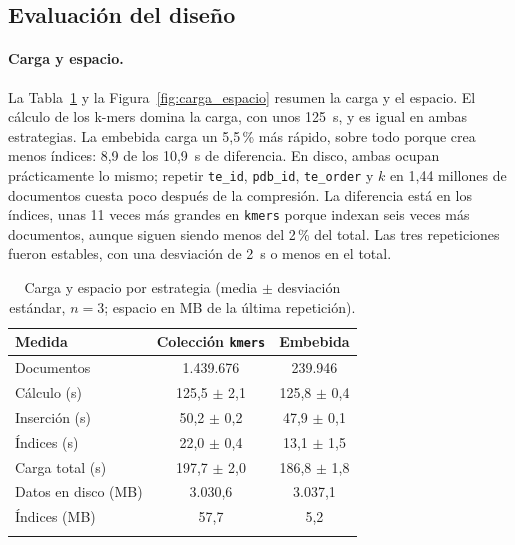 \documentclass[unnumsec,namedate,webpdf,contemporary,large]{oup-authoring-template}
\begin{document}
\subsection{Evaluaci\'on del dise\~no}

\paragraph{Carga y espacio.}
La Tabla~\ref{tab:carga} y la Figura~\ref{fig:carga_espacio} resumen la carga y el espacio. El c\'alculo de los k-mers domina la carga, con unos 125~s, y es igual en ambas estrategias. La embebida carga un 5,5\,\% m\'as r\'apido, sobre todo porque crea menos \'indices: 8,9 de los 10,9~s de diferencia. En disco, ambas ocupan pr\'acticamente lo mismo; repetir \texttt{te\_id}, \texttt{pdb\_id}, \texttt{te\_order} y $k$ en 1,44 millones de documentos cuesta poco despu\'es de la compresi\'on. La diferencia est\'a en los \'indices, unas 11 veces m\'as grandes en \texttt{kmers} porque indexan seis veces m\'as documentos, aunque siguen siendo menos del 2\,\% del total. Las tres repeticiones fueron estables, con una desviaci\'on de 2~s o menos en el total.

\begin{table}[!t]
\caption{Carga y espacio por estrategia (media $\pm$ desviaci\'on est\'andar, $n = 3$; espacio en MB de la \'ultima repetici\'on).\label{tab:carga}}
\footnotesize
\begin{tabular*}{\columnwidth}{@{\extracolsep{\fill}}lcc@{}}
\toprule
Medida & Colecci\'on \texttt{kmers} & Embebida \\
\midrule
Documentos & 1.439.676 & 239.946 \\
C\'alculo (s) & 125,5 $\pm$ 2,1 & 125,8 $\pm$ 0,4 \\
Inserci\'on (s) & 50,2 $\pm$ 0,2 & 47,9 $\pm$ 0,1 \\
\'Indices (s) & 22,0 $\pm$ 0,4 & 13,1 $\pm$ 1,5 \\
Carga total (s) & 197,7 $\pm$ 2,0 & 186,8 $\pm$ 1,8 \\
Datos en disco (MB) & 3.030,6 & 3.037,1 \\
\'Indices (MB) & 57,7 & 5,2 \\
\botrule
\end{tabular*}
\end{table}
\end{document}

